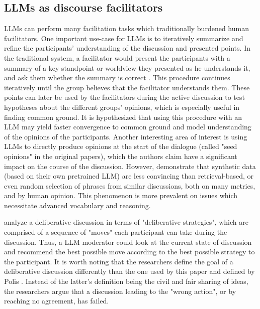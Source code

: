 \subsection{LLMs as discourse facilitators}
\label{sec:related:discource}


LLMs can perform many facilitation tasks which traditionally burdened human facilitators. One important use-case for LLMs is to iteratively summarize and refine the participants' understanding of the discussion and presented points. In the traditional system, a facilitator would present the participants with a summary of a key standpoint or worldview they presented as he understands it, and ask them whether the summary is correct \cite{small-polis-llm, Tsai2024Generative}. This procedure continues iteratively until the group believes that the facilitator understands them. These points can later be used by the facilitators during the active discussion to test hypotheses about the different groups' opinions, which is especially useful in finding common ground. It is hypothesized that using this procedure with an LLM may yield faster convergence to common ground and model understanding of the opinions of the participants. Another interesting area of interest is using LLMs to directly produce opinions \cite{small-polis-llm} at the start of the dialogue (called "seed opinions" in the original papers), which the authors claim have a significant impact on the course of the discussion. However, \cite{karadzhov2023delidata} demonstrate that synthetic data (based on their own pretrained LLM) are less convincing than retrieval-based, or even random selection of phrases from similar discussions, both on many metrics, and by human opinion. This phenomenon is more prevalent on issues which necessitate advanced vocabulary and reasoning.

\citet{al-khatib-etal-2018-modeling} analyze a deliberative discussion in terms of "deliberative strategies", which are comprised of a sequence of "moves" each participant can take during the discussion. Thus, a LLM moderator could look at the current state of discussion and recommend the best possible move according to the best possible strategy to the participant. It is worth noting that the researchers define the goal of a deliberative discussion differently than the one used by this paper and defined by Polis \cite{small-polis-llm}. Instead of the latter's definition being the civil and fair sharing of ideas, the researchers argue that a discussion leading to the "wrong action", or by reaching no agreement, has failed.

